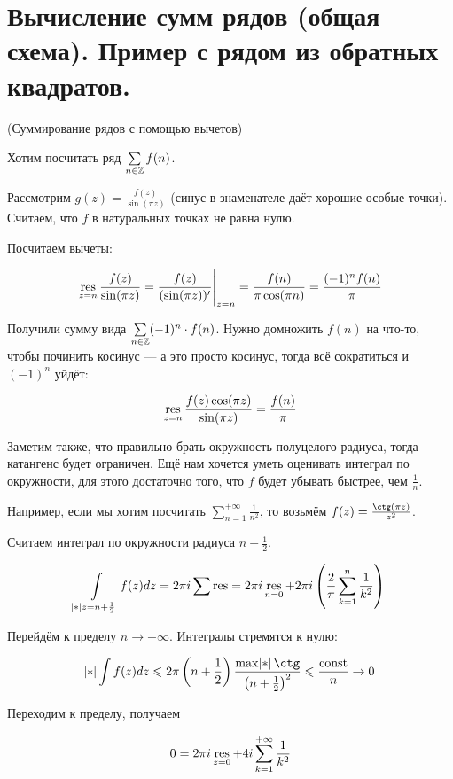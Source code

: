\section{Вычисление сумм рядов (общая схема). Пример с рядом из обратных квадратов.}

\begin{example}
    (Суммирование рядов с помощью вычетов)

    Хотим посчитать ряд $\sum\limits_{n\in\mathbb{Z}} f(n)$.
    
    Рассмотрим $g(z) = \frac{f(z)}{\sin (\pi z)}$ (синус в знаменателе даёт хорошие особые точки). Считаем, что $f$ в натуральных точках не равна нулю.

    Посчитаем вычеты:

    \[
        \res\limits_{z=n} \frac{f(z)}{\sin (\pi z)} =
        \eval{\frac{f(z)}{(\sin(\pi z))'}}_{z=n} =
        \frac{f(n)}{\pi \cos(\pi n)} =
        \frac{(-1)^nf(n)}{\pi}
    \]

    Получили сумму вида $\sum\limits_{n\in\mathbb{Z}} (-1)^n \cdot f(n)$. Нужно домножить $f(n)$ на что-то, чтобы починить косинус --- а это просто косинус, тогда всё сократиться и $(-1)^n$ уйдёт:

    \[
        \operatorname*{res}\limits_{z=n} \frac{f(z)\cos(\pi z)}{\sin (\pi z)} =
        \frac{f(n)}{\pi}
    \]

    Заметим также, что правильно брать окружность полуцелого радиуса, тогда катангенс будет ограничен. Ещё нам хочется уметь оценивать интеграл по окружности, для этого достаточно того, что $f$ будет убывать быстрее, чем $\frac{1}{n}$.

    Например, если мы хотим посчитать $\sum\limits_{n=1}^{+\infty}
        \frac{1}{n^2}$, то возьмём $f(z) = \frac{\ctg(\pi z)}{z^2}$.

    Считаем интеграл по окружности радиуса $n + \frac12$.

    \[
        \int\limits_{\abs{z}=n+\frac{1}{2}} f(z)dz =
        2\pi i\sum\res
        = 2\pi i\res\limits_{n=0} + 2\pi i
        \left(\frac{2}{\pi} \sum\limits_{k=1}^n \frac{1}{k^2}\right)
    \]

    Перейдём к пределу $n \to +\infty$.
    Интегралы стремятся к нулю:

    \[
        \abs{\int f(z)dz} \le 2\pi \left(n + \frac12\right)
        \frac{\max \abs{\ctg}}{\left(n+\frac12\right)^2}
        \le \frac{\mathrm{const}}{n} \to 0
    \]

    Переходим к пределу, получаем

    \[
        0 = 2\pi i \operatorname*{res}\limits_{z=0}
        + 4i\sum\limits_{k=1}^{+\infty} \frac{1}{k^2}
    \]


\end{example}
